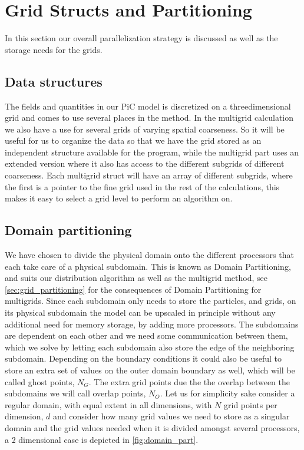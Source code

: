 	\section{Grid Structs and Partitioning}
		In this section our overall parallelization strategy is discussed as well
		as the storage needs for the grids.

	\subsection{Data structures}
	The fields and quantities in our PiC model is discretized on a threedimensional
	grid and comes to use several places in the method. In the multigrid calculation
	we also have a use for several grids of varying spatial coarseness. So it will
	be useful for us to organize the data so that we have the grid stored as an
	independent structure available for the program, while the multigrid part uses
	an extended version where it also has access to the different subgrids of different
	coarseness. Each multigrid struct will have an array of different subgrids,
	where the first is a pointer to the fine grid used in the rest of the calculations,
	this makes it easy to select a grid level to perform an algorithm on.

	\subsection{Domain partitioning}
		We have chosen to divide the physical domain onto the different processors that each take
		care of a physical subdomain. This is known as Domain Partitioning, and suits
		our distribution algorithm as well as the multigrid method, see \cref{sec:grid_partitioning}
		for the consequences of Domain Partitioning for multigrids. Since each
		subdomain only needs to store the particles, and grids, on its physical subdomain
		the model can be upscaled in principle without any additional need for memory storage,
		by adding more processors.
		The subdomains are dependent on each other and we need
		some communication between them, which we solve by letting each subdomain
		also store the edge of the neighboring subdomain. Depending on the boundary
		conditions it could also be useful to store an extra set of values on the
		outer domain boundary as well, which will be called ghost points, \(N_G\).
		The extra grid points due the the overlap between the subdomains we will call
		overlap points, \(N_O\). Let us for simplicity sake consider a regular domain,
		with equal extent in all dimensions, with \(N\) grid points per dimension,
		\(d\) and consider how many grid values we need to store as a singular domain
		and the grid values needed when it is divided amongst several processors, a
		2 dimensional case is depicted in \cref{fig:domain_part}.

